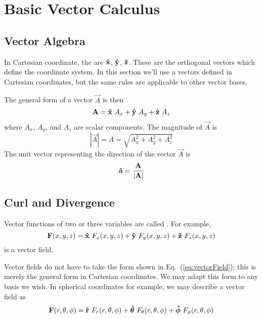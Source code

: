 \section{Basic Vector Calculus}

\subsection{Vector Algebra}
In Cartesian coordinate, the  are $\boldsymbol{{\mathrm{\hat{x}}}}$, $\boldsymbol{{\mathrm{\hat{y}}}}$, $\boldsymbol{{\mathrm{\hat{z}}}}$. These are the orthogonal vectors which define the coordinate system. In this section we'll use a vectors defined in Cartesian coordinates, but the same rules are applicable to other vector bases.\par 

The general form of a vector $\vec{A}$ is then 
\begin{equation}
    \vec{A} = \uvec{x}\ A_x + \uvec{y}\ A_y + \uvec{z}\ A_z 
\end{equation}
where $A_x$, $A_y$, and $A_z$ are scalar components. The magnitude of $\vec{A}$ is 
\begin{equation}
    |\vec{A}| = A = \sqrt{A_x^2 + A_y^2 + A_z^2}
\end{equation}
The unit vector representing the direction of the vector $\vec{A}$ is 
\begin{equation}
    \boldsymbol{{\mathrm{\hat{a}}}} = \dfrac{\boldsymbol{\mathrm{A}}}{|\boldsymbol{\mathrm{A}}|}
\end{equation}

\subsection{Curl and Divergence}
Vector functions of two or three variables are called . For example,
\begin{equation}
    \boldsymbol{\mathrm{F}}(x,y,z) = \boldsymbol{{\mathrm{\hat{x}}}} \ F_x(x,y,z) + \boldsymbol{{\mathrm{\hat{y}}}} \ F_y(x,y,z) + \boldsymbol{{\mathrm{\hat{z}}}} \ F_z(x,y,z) \label{eq:vectorField}
\end{equation}
is a vector field.
\begin{note}
    Vector fields do not have to take the form shown in Eq.\ (\ref{eq:vectorField}); this is merely the general form in Cartesian coordinates. We may adapt this form to any basis we wish. In spherical coordinates for example, we may describe a vector field as 
    \begin{equation}
        \boldsymbol{\mathrm{F}}(r,\theta,\phi) = \boldsymbol{{\mathrm{\hat{r}}}}\ F_r(r,\theta,\phi) + \boldsymbol{{\mathrm{\hat{\theta}}}}\ F_\theta(r,\theta,\phi) + \boldsymbol{{\mathrm{\hat{\phi}}}}\ F_\phi(r,\theta,\phi) 
    \end{equation}
\end{note}

